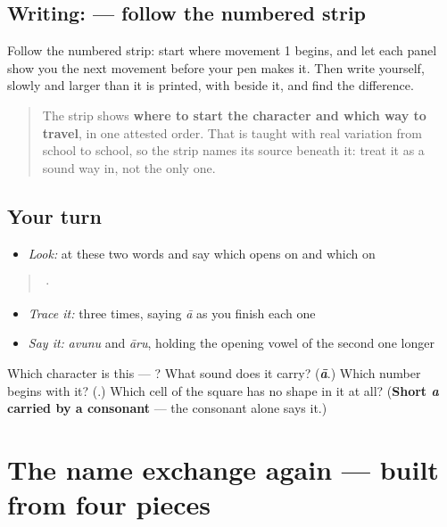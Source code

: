 \subsection*{Writing:  — follow the numbered strip}

Follow the numbered strip: start where movement 1 begins, and let each panel show you the next movement before your pen makes it. Then write  yourself, slowly and larger than it is printed, with  beside it, and find the difference.

\begin{quote}
The strip shows \textbf{where to start the character and which way to travel}, in one attested order. That is taught with real variation from school to school, so the strip names its source beneath it: treat it as a sound way in, not the only one.
\end{quote}

\subsection*{Your turn}
\begin{itemize}
\raggedright
  \item \emph{Look:} at these two words and say which opens on  and which on 
\end{itemize}

\begin{quote}
  ·  
\end{quote}

\begin{itemize}
\raggedright
  \item \emph{Trace it:}  three times, saying \emph{ā} as you finish each one
  \item \emph{Say it:} \emph{avunu} and \emph{āru}, holding the opening vowel of the second one longer
\end{itemize}

\begin{tcolorbox}[breakable,colback=teal!4,colframe=teal!35!black,title={Before you move on}]
Which character is this — ? What sound does it carry? (\emph{\textbf{ā}}.) Which number begins with it? (\textbf{}.) Which cell of the square has no shape in it at all? (\textbf{Short \emph{a} carried by a consonant} — the consonant alone says it.)
\end{tcolorbox}
\section[(dialogue)]{The name exchange again — built from four pieces}

